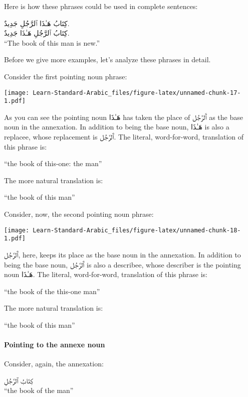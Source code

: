 \documentclass[
  10pt,
]{book}
\begin{document}
Here is how these phrases could be used in complete sentences:

\foreignlanguage{arabic}{کِتَابُ هَـٰذَا ٱلرَّجُلِ جَدِيدٌ.}\\
\foreignlanguage{arabic}{کِتَابُ ٱلرَّجُلِ هَـٰذَا جَدِيدٌ.}\\
\enquote{The book of this man is new.}

Before we give more examples, let's analyze these phrases in detail.

Consider the first pointing noun phrase:

\texttt{[image: Learn-Standard-Arabic\_files/figure-latex/unnamed-chunk-17-1.pdf]}

As you can see the pointing noun
\foreignlanguage{arabic}{هَـٰذَا} has taken the place of
\foreignlanguage{arabic}{ٱَلرَّجُل} as the base noun in the annexation.
In addition to being the base noun,
\foreignlanguage{arabic}{هَـٰذَا} is also a replacee, whose replacement is
\foreignlanguage{arabic}{ٱَلرَّجُل}.
The literal, word-for-word, translation of this phrase is:

\enquote{the book of this-one: the man}

The more natural translation is:

\enquote{the book of this man}

Consider, now, the second pointing noun phrase:

\texttt{[image: Learn-Standard-Arabic\_files/figure-latex/unnamed-chunk-18-1.pdf]}

\foreignlanguage{arabic}{ٱَلرَّجُل}, here, keeps its place as the base noun in the annexation.
In addition to being the base noun,
\foreignlanguage{arabic}{ٱَلرَّجُل}
is also a describee, whose describer is the pointing noun
\foreignlanguage{arabic}{هَـٰذَا}.
The literal, word-for-word, translation of this phrase is:

\enquote{the book of the this-one man}

The more natural translation is:

\enquote{the book of this man}

\paragraph{Pointing to the annexe noun}\label{pointing-to-the-annexe-noun}

Consider, again, the annexation:

\foreignlanguage{arabic}{کِتَابُ ٱلرَّجُلِ}\\
\enquote{the book of the man}
\end{document}
